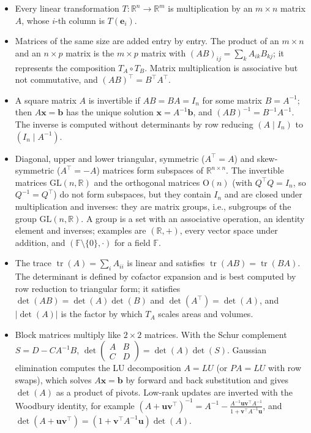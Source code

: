 \documentclass[11pt]{article}
\theoremstyle{definition}
\theoremstyle{plain}
\theoremstyle{remark}
\DeclareMathOperator{\tr}{tr}
\begin{document}
\begin{itemize}[leftmargin=*]
	\item Every linear transformation $T: \mathbb{R}^n \to \mathbb{R}^m$ is multiplication by an $m \times n$ matrix $A$, whose $i$-th column is $T(\mathbf{e}_i)$.
	\item Matrices of the same size are added entry by entry. The product of an $m \times n$ and an $n \times p$ matrix is the $m \times p$ matrix with $(AB)_{ij} = \sum_k A_{ik} B_{kj}$; it represents the composition $T_A \circ T_B$. Matrix multiplication is associative but not commutative, and $(AB)^\top = B^\top A^\top$.
	\item A square matrix $A$ is invertible if $AB = BA = I_n$ for some matrix $B = A^{-1}$; then $A\mathbf{x} = \mathbf{b}$ has the unique solution $\mathbf{x} = A^{-1}\mathbf{b}$, and $(AB)^{-1} = B^{-1}A^{-1}$. The inverse is computed without determinants by row reducing $(A \mid I_n)$ to $(I_n \mid A^{-1})$.
	\item Diagonal, upper and lower triangular, symmetric ($A^\top = A$) and skew-symmetric ($A^\top = -A$) matrices form subspaces of $\mathbb{R}^{n \times n}$. The invertible matrices $\mathrm{GL}(n, \mathbb{R})$ and the orthogonal matrices $\mathrm{O}(n)$ (with $Q^\top Q = I_n$, so $Q^{-1} = Q^\top$) do not form subspaces, but they contain $I_n$ and are closed under multiplication and inverses: they are matrix groups, i.e., subgroups of the group $\mathrm{GL}(n, \mathbb{R})$. A group is a set with an associative operation, an identity element and inverses; examples are $(\mathbb{R}, +)$, every vector space under addition, and $(\mathbb{F} \setminus \{0\}, \cdot)$ for a field $\mathbb{F}$.
	\item The trace $\tr(A) = \sum_i A_{ii}$ is linear and satisfies $\tr(AB) = \tr(BA)$. The determinant is defined by cofactor expansion and is best computed by row reduction to triangular form; it satisfies $\det(AB) = \det(A)\det(B)$ and $\det(A^\top) = \det(A)$, and $|\det(A)|$ is the factor by which $T_A$ scales areas and volumes.
	\item Block matrices multiply like $2 \times 2$ matrices. With the Schur complement $S = D - CA^{-1}B$, $\det\begin{pmatrix} A & B \\ C & D \end{pmatrix} = \det(A)\det(S)$. Gaussian elimination computes the LU decomposition $A = LU$ (or $PA = LU$ with row swaps), which solves $A\mathbf{x} = \mathbf{b}$ by forward and back substitution and gives $\det(A)$ as a product of pivots. Low-rank updates are inverted with the Woodbury identity, for example $(A + \mathbf{u}\mathbf{v}^\top)^{-1} = A^{-1} - \frac{A^{-1}\mathbf{u}\mathbf{v}^\top A^{-1}}{1 + \mathbf{v}^\top A^{-1}\mathbf{u}}$, and $\det(A + \mathbf{u}\mathbf{v}^\top) = (1 + \mathbf{v}^\top A^{-1}\mathbf{u})\det(A)$.

\end{itemize}
\end{document}
